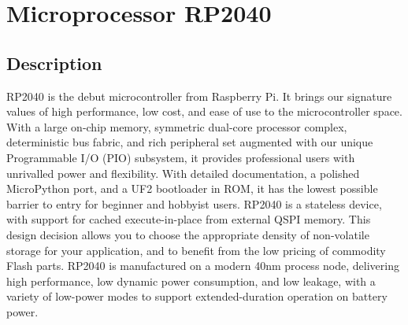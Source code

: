 %
%

\chapter{Microprocessor RP2040}
	
\section{Description}
	
	RP2040 is the debut microcontroller from Raspberry Pi. It brings our signature values of high performance, low cost, and ease of use to the microcontroller space.\cite{RaspberryPiRP2040:2024} With a large on-chip memory, symmetric dual-core processor complex, deterministic bus fabric, and rich peripheral set augmented with our unique Programmable I/O (PIO) subsystem, it provides professional users with unrivalled power and flexibility. With detailed documentation, a polished MicroPython port, and a UF2 bootloader in ROM, it has the lowest possible barrier to entry for beginner and hobbyist users. RP2040 is a stateless device, with support for cached execute-in-place from external QSPI memory.\cite{RaspberryPiRP2040:2024} This design decision allows you to choose the appropriate density of non-volatile storage for your application, and to benefit from the low pricing of commodity Flash parts. RP2040 is manufactured on a modern 40nm process node, delivering high performance, low dynamic power consumption, and low leakage, with a variety of low-power modes to support extended-duration operation on battery power.\cite{RaspberryPiRP2040:2024}




